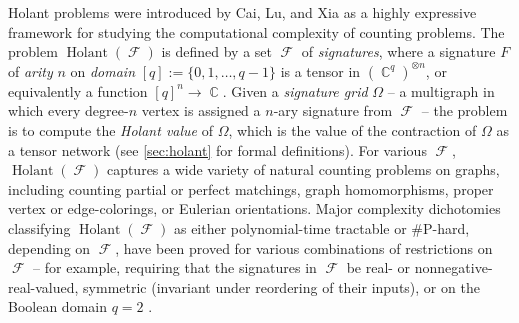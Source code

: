 \documentclass{theoretics}
\DeclareMathOperator{\cc}{\mathbb{C}}
\DeclareMathOperator{\fc}{\mathcal{F}}
\DeclareMathOperator{\holant}{Holant}
\begin{document}
Holant problems were introduced by Cai, Lu, and Xia \cite{cai_computational_2011} as a highly
expressive framework for studying the computational complexity of counting problems. 
The problem $\holant(\fc)$ is defined by a set $\fc$ of \emph{signatures}, 
where a signature $F$ of \emph{arity}
$n$ on \emph{domain} $[q] := \{0,1,\ldots,q-1\}$ is a tensor in $(\cc^q)^{\otimes n}$, or equivalently
a function $[q]^n \to \cc$.
Given a \emph{signature grid} $\Omega$ -- a multigraph in which every degree-$n$ vertex is assigned a
$n$-ary signature from $\fc$ --
the problem is to compute the \emph{Holant value} of $\Omega$, which is the value
of the contraction of $\Omega$ as a tensor network (see \autoref{sec:holant} for formal definitions). 
For various $\fc$, $\holant(\fc)$ captures a wide variety of natural counting problems on
graphs, including counting partial or perfect matchings, graph homomorphisms, 
proper vertex or edge-colorings, or Eulerian orientations.
Major complexity dichotomies classifying $\holant(\fc)$ as either 
polynomial-time tractable or \#P-hard,
depending on $\fc$, have been proved for various combinations of restrictions on $\fc$ -- for example,
requiring that the signatures in $\fc$ be real- or nonnegative-real-valued, symmetric
(invariant under reordering of their inputs), or on the Boolean domain $q=2$
\cite{huang_2016_dichotomy,cai_complete_2016,cai2015holant,lin_complexity_2018,shao}.
\end{document}
